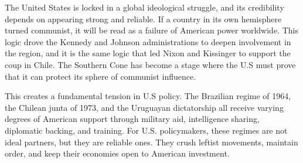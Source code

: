 The United States is locked in a global ideological struggle, and its credibility depends on appearing strong and reliable. If a country in its own hemisphere turned communist, it will be read as a failure of American power worldwide. This logic drove the Kennedy and Johnson administrations to deepen involvement in the region, and it is the same logic that led Nixon and Kissinger to support the coup in Chile. The Southern Cone has become a stage where the U.S must prove that it can protect its sphere of communist influence.

This creates a fundamental tension in U.S policy. The Brazilian regime of 1964, the Chilean junta of 1973, and the Uruguayan dictatorship all receive varying degrees of American support through military aid, intelligence sharing, diplomatic backing, and training. For U.S. policymakers, these regimes are not ideal partners, but they are reliable ones. They crush leftist movements, maintain order, and keep their economies open to American investment.
